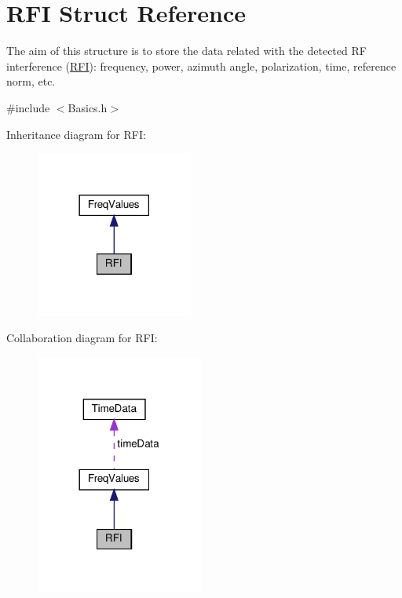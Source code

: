 \hypertarget{structRFI}{}\section{R\+FI Struct Reference}
\label{structRFI}


The aim of this structure is to store the data related with the detected RF interference (\hyperlink{structRFI}{R\+FI})\+: frequency, power, azimuth angle, polarization, time, reference norm, etc.  




{\ttfamily \#include $<$Basics.\+h$>$}



Inheritance diagram for R\+FI\+:\nopagebreak
\begin{figure}[H]
\begin{center}
\leavevmode
\includegraphics[width=146pt]{structRFI__inherit__graph}
\end{center}
\end{figure}


Collaboration diagram for R\+FI\+:\nopagebreak
\begin{figure}[H]
\begin{center}
\leavevmode
\includegraphics[width=156pt]{structRFI__coll__graph}
\end{center}
\end{figure}
